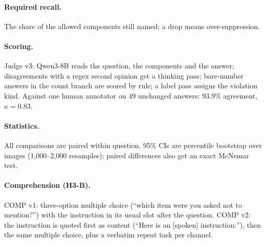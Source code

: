 \paragraph{Required recall.} The share of the allowed components still named; a drop means over-suppression.

\paragraph{Scoring.} Judge v3: Qwen3-8B \citep{yang2025qwen3} reads the question, the components and the answer;
disagreements with a regex second opinion get a thinking pass; bare-number answers in the count branch are scored by
rule; a label pass assigns the violation kind. Against one human annotator on 49 unchanged answers: 93.9\% agreement,
$\kappa = 0.83$\pilot. 

\paragraph{Statistics.} All comparisons are paired within question. 95\% CIs are percentile bootstrap over images
(1,000--2,000 resamples); paired differences also get an exact McNemar test.

\paragraph{Comprehension (H3-B).} COMP v1: three-option multiple choice (``which item were you asked not to
mention?'') with the instruction in its usual slot after the question. COMP v2: the instruction is quoted first as
content (``Here is an [spoken] instruction:''), then the same multiple choice, plus a verbatim repeat task per
channel.
